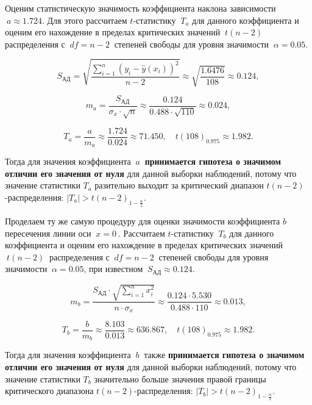 \documentclass[
]{article}
\begin{document}
Оценим статистическую значимость коэффициента наклона зависимости
\(\ a \approx 1.724\). Для этого рассчитаем \(t\)-статистику \(\ T_a\)
для данного коэффициента и оценим его нахождение в пределах критических
значений \(\ t(n-2)\ \) распределения с \(\ df = n-2\ \) степеней
свободы для уровня значимости \(\ \alpha = 0.05\).

\[
S_{\text{АД}} = \sqrt{\frac{\sum\limits_{i=1}^{n}\left( y_i - \hat{y}(x_i)  \right)^2}{n-2}} \approx \sqrt{\frac{1.6476}{108}} \approx 0.124,
\]

\[
m_a = \frac{S_{\text{АД}}}{\sigma_x \cdot \sqrt{n}} \approx \frac{0.124}{0.488 \cdot \sqrt{110}} \approx 0.024,
\]

\[
T_a = \frac{a}{m_a} \approx \frac{1.724}{0.024} \approx 71.450, \quad t(108)_{0.975} \approx 1.982.
\]

Тогда для значения коэффициента \(\ a\ \) \textbf{принимается гипотеза о
значимом отличии его значения от нуля} для данной выборки наблюдений,
потому что значение статистики \(T_a\) разительно выходит за критический
диапазон \(t(n-2)\)-распределения:
\(|T_a| > t(n-2)_{1 - \frac{\alpha}{2}}\).

Проделаем ту же самую процедуру для оценки значимости коэффициента \(b\)
пересечения линии оси \(\ x = 0\ \). Рассчитаем \(t\)-статистику
\(\ T_b\) для данного коэффициента и оценим его нахождение в пределах
критических значений \(\ t(n-2)\ \) распределения с \(\ df = n-2\ \)
степеней свободы для уровня значимости \(\ \alpha = 0.05\), при
известном \(\ S_{\text{АД}} \approx 0.124\).

\[
m_b = \frac{S_{\text{АД}} \cdot \sqrt{\sum\limits_{i=1}^{n}x_i^2}}{n \cdot \sigma_x} \approx \frac{0.124 \cdot 5.530}{0.488 \cdot 110} \approx 0.013,
\]

\[
T_b = \frac{b}{m_b} \approx \frac{8.103}{0.013} \approx 636.867, \quad t(108)_{0.975} \approx 1.982.
\]

Тогда для значения коэффициента \(\ b\ \) также \textbf{принимается
гипотеза о значимом отличии его значения от нуля} для данной выборки
наблюдений, потому что значение статистики \(T_b\) значительно больше
значения правой границы критического диапазона \(t(n-2)\)-распределения:
\(|T_b| > t(n-2)_{1 - \frac{\alpha}{2}}\).
\end{document}
